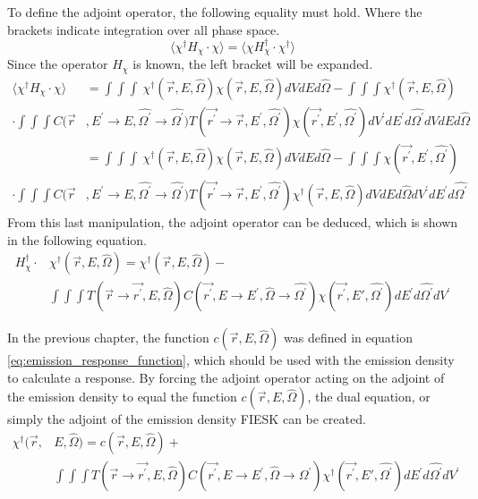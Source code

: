 To define the adjoint operator, the following equality must hold. Where the 
brackets indicate integration over all phase space.
\begin{equation*}
  \langle \chi^{\dagger}H_{\chi} \cdot \chi \rangle = 
  \langle \chi H_{\chi}^{\dagger} \cdot \chi^{\dagger} \rangle
\end{equation*}
Since the operator $H_{\chi}$ is known, the left bracket will be expanded.
\begin{align}
  \langle \chi^{\dagger}H_{\chi} \cdot \chi \rangle & =
  \int\int\int \
  \chi^{\dagger}(\vec{r},E,\hat{\Omega}) \chi(\vec{r},E,\hat{\Omega})
  dV dE d\hat{\Omega} - \int\int\int \chi^{\dagger}(\vec{r},E,\hat{\Omega}) 
  \nonumber \\
  \cdot \int\int\int 
  C(\vec{r}&,E^{'} \to E, \hat{\Omega^{'}} \to \hat{\Omega^{'}})
  T(\vec{r^{'}} \to \vec{r},E^{'},\hat{\Omega^{'}})
  \chi(\vec{r^{'}},E^{'},\hat{\Omega^{'}}) dV^{'}dE^{'}d\hat{\Omega^{'}}
  dV dE d\hat{\Omega} \nonumber \\
  & = \int\int\int \
  \chi^{\dagger}(\vec{r},E,\hat{\Omega}) \chi(\vec{r},E,\hat{\Omega})
  dV dE d\hat{\Omega} - \int\int\int \chi(\vec{r^{'}},E^{'},\hat{\Omega^{'}}) 
  \nonumber \\
  \cdot \int\int\int 
  C(\vec{r}&,E^{'} \to E, \hat{\Omega^{'}} \to \hat{\Omega^{'}})
  T(\vec{r^{'}} \to \vec{r},E^{'},\hat{\Omega^{'}})
  \chi^{\dagger}(\vec{r},E,\hat{\Omega}) dV dE d\hat{\Omega}
  dV^{'}dE^{'}d\hat{\Omega^{'}}
\end{align}
From this last manipulation, the adjoint operator can be deduced, which is 
shown in the following equation.
\begin{equation}
  \begin{split}
    H_{\chi}^{\dagger} \cdot &\chi^{\dagger}(\vec{r},E,\hat{\Omega}) = 
    \chi^{\dagger}(\vec{r},E,\hat{\Omega}) - \\
    & \int\int\int T(\vec{r} \to \vec{r^{'}},E,\hat{\Omega}) 
    C(\vec{r^{'}},E \to E^{'},\hat{\Omega} \to \hat{\Omega^{'}})
    \chi(\vec{r^{'}},E',\hat{\Omega^{'}}) dE^{'}d\hat{\Omega^{'}}dV^{'}
  \end{split}
\end{equation}

In the previous chapter, the function $c(\vec{r},E,\hat{\Omega})$ was defined 
in equation \ref{eq:emission_response_function}, which should be used with 
the emission density to calculate a response. By forcing the adjoint 
operator acting on the adjoint of the emission density to equal the 
function $c(\vec{r},E,\hat{\Omega})$, the dual equation, or simply the adjoint
of the emission density FIESK can be created.
\begin{equation}
  \begin{split}
    \chi^{\dagger}(\vec{r},&E,\hat{\Omega}) = c(\vec{r},E,\hat{\Omega}) + \\
    &\int\int\int T(\vec{r} \to \vec{r^{'}},E,\hat{\Omega}) 
    C(\vec{r^{'}},E \to E^{'},\hat{\Omega} \to \hat{\Omega^{'}})
    \chi^{\dagger}(\vec{r^{'}},E',\hat{\Omega^{'}}) dE^{'}d\hat{\Omega^{'}}dV^{'}
  \end{split}
  \label{eq:adjoint_of_emission_density_integral_eqn}
\end{equation}

